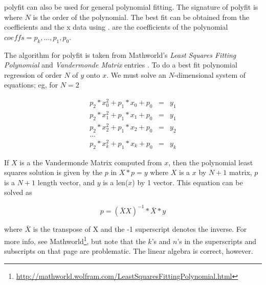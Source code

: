 \documentclass[twoside]{book}
\begin{document}
polyfit can also be used for general polynomial fitting.  The
signature of polyfit is  where $N$ is
the order of the polynomial.  The best fit can be obtained from the
coefficients and the x data using .
 are the coefficients of the polynomial $coeffs = p_k,
\dots, p_1, p_0$.


The algorithm for polyfit is taken from Mathworld's \textit{Least
  Squares Fitting Polynomial} and \textit{Vandermonde Matrix} entries
\citep{Weisstein2002}.
To do a best fit polynomial regression of order $N$ of $y$ onto $x$.
We must solve an $N$-dimensional system of equations; eg, for $N=2$

\begin{eqnarray}
  \label{eq:polysys}
      p_2*x_0^2 +  p_1*x_0 + p_0 &=& y_1\nonumber\\
      p_2*x_1^2 +  p_1*x_1 + p_0 &=& y_1\nonumber\\
      p_2*x_2^2 +  p_1*x_2 + p_0 &=& y_2\nonumber\\
      \dots & \nonumber\\
      p_2*x_k^2 +  p_1*x_k + p_0 &=& y_k\nonumber
\end{eqnarray}

\noindent If $X$ is a the Vandermonde Matrix computed from $x$, then the
polynomial least squares solution is given by the $p$ in $X*p = y$
where $X$ is a $x$ by $N+1$ matrix, $p$ is a $N+1$ length vector, and
$y$ is a len($x$) by 1 vector.  This equation can be solved as

\begin{equation}
  p = (\bar{X} X)^{-1} * \bar{X} * y
\end{equation}
      
\noindent where $\bar{X}$ is the transpose of X and the -1 superscript
denotes the inverse.  For more info, see
Mathworld\footnote{\url{http://mathworld.wolfram.com/LeastSquaresFittingPolynomial.html}},
but note that the $k$'s and $n$'s in the superscripts and subscripts
on that page are problematic.  The linear algebra is correct, however.


\end{document}
